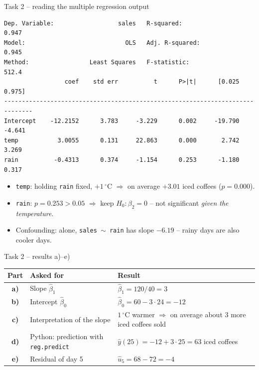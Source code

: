 \documentclass[aspectratio=169,11pt]{beamer}
\renewcommand{\textasciitilde}{\ensuremath{\sim}}
\begin{document}
\begin{frame}[fragile]{Task 2 -- reading the multiple regression output}
\begin{lstlisting}[style=Pyout]
Dep. Variable:                  sales   R-squared:                       0.947
Model:                            OLS   Adj. R-squared:                  0.945
Method:                 Least Squares   F-statistic:                     512.4
                 coef    std err          t      P>|t|      [0.025      0.975]
------------------------------------------------------------------------------
Intercept    -12.2152      3.783     -3.229      0.002     -19.790      -4.641
temp           3.0055      0.131     22.863      0.000       2.742       3.269
rain          -0.4313      0.374     -1.154      0.253      -1.180       0.317
\end{lstlisting}
  \begin{itemize}\setlength{\itemsep}{2pt}\small
    \item \texttt{temp}: holding \texttt{rain} fixed, $+1$\,$^{\circ}$C $\Rightarrow$ on average $+3.01$ iced coffees ($p = 0.000$).
    \item \texttt{rain}: $p = 0.253 > 0.05$ $\Rightarrow$ keep $H_0\colon \beta_2 = 0$ -- not significant \emph{given the temperature}.
    \item Confounding: alone, \texttt{sales \textasciitilde{} rain} has slope $-6.19$ -- rainy days are also cooler days.
  \end{itemize}
\end{frame}

\begin{frame}{Task 2 -- results a)--e)}
  \begin{center}\small
  \renewcommand{\arraystretch}{1.35}
  \begin{tabular}{@{}c>{\raggedright\arraybackslash}p{4.9cm}>{\raggedright\arraybackslash}p{8.4cm}@{}}
    \toprule Part & Asked for & Result\\ \midrule
    \textbf{a)} & Slope $\hat\beta_1$ & $\hat\beta_1 = 120/40 = 3$\\
    \textbf{b)} & Intercept $\hat\beta_0$ & $\hat\beta_0 = 60 - 3\cdot 24 = -12$\\
    \textbf{c)} & Interpretation of the slope & $1$\,$^{\circ}$C warmer $\Rightarrow$ on average about $3$ more iced coffees sold\\
    \textbf{d)} & Python: prediction with \texttt{reg.predict} & $\hat y(25) = -12 + 3\cdot 25 = 63$ iced coffees\\
    \textbf{e)} & Residual of day 5 & $\hat u_5 = 68 - 72 = -4$\\
    \bottomrule
  \end{tabular}
  \end{center}
\end{frame}
\end{document}
